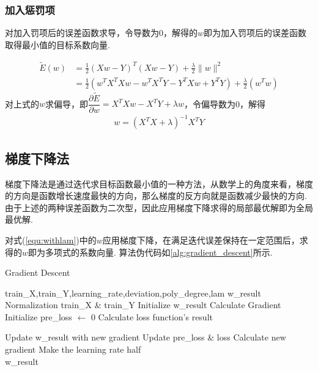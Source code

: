 \documentclass{hitreport}
\begin{document}
\subsubsection{加入惩罚项}

对加入罚项后的误差函数求导，令导数为0，解得的$w$即为加入罚项后的误差函数取得最小值的目标系数向量.

\begin{align}
\tilde{E}\left( w \right) &=\frac{1}{2}\left( Xw-Y \right) ^T\left( Xw-Y \right) +\frac{\lambda}{2}\lVert w \rVert ^2\\
	&=\frac{1}{2}\left( w^TX^TXw-w^TX^TY-Y^TXw+Y^TY \right) +\frac{\lambda}{2}\left( w^Tw \right)\label{equ:losswithlam}
\end{align}
对上式的$w$求偏导，即$\dfrac{\partial \tilde {E} }{\partial w} = X^{T}Xw-X^{T}Y +\lambda w$，令偏导数为0，解得
\begin{align}
w = \left(X^{T}X +\lambda \right)^{-1}X^{T}Y
\end{align}

\subsection{梯度下降法}\label{sec:gradient}

梯度下降法是通过迭代求目标函数最小值的一种方法，从数学上的角度来看，梯度的方向是函数增长速度最快的方向，那么梯度的反方向就是函数减少最快的方向.由于上述的两种误差函数为二次型，因此应用梯度下降求得的局部最优解即为全局最优解.

对式(\ref{equ:withlam})中的$w$应用梯度下降，在满足迭代误差保持在一定范围后，求得的$w$即为多项式的系数向量. 算法伪代码如\ref{alg:gradient_descent}所示.

\begin{center}
\begin{minipage}{11cm}
\begin{algorithm}[H]  
  \caption{Gradient Descent}  
  \label{alg:gradient_descent}  
  \begin{algorithmic}  
    \Require  
    train\_X,train\_Y,learning\_rate,deviation,poly\_degree,lam
    \Ensure  
   	w\_result
   	\State Normalization train\_X \& train\_Y
   	\State Initialize w\_result
   	\State Calculate Gradient
   	\State Initialize pre\_loss $\leftarrow$ 0
   	\State Calculate loss function's result
   	
   		\State Update w\_result with new gradient
   		\State Update pre\_loss \& loss
   		\State Calculate new gradient
   			\State Make the learning rate half
   		\EndIf
   	\EndWhile\\
   	\Return w\_result
  \end{algorithmic}  
\end{algorithm}
\end{minipage}
\end{center}
\end{document}
